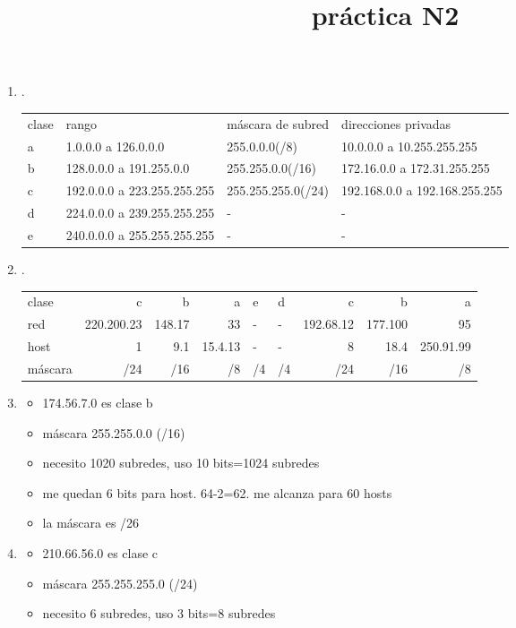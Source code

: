 \documentclass[11pt]{article}
\date{}
\title{práctica N2}
\begin{document}
\maketitle
\begin{enumerate}
\item .
\begin{center}
\begin{tabular}{llll}
clase & rango & máscara de subred & direcciones privadas\\
a & 1.0.0.0 a 126.0.0.0 & 255.0.0.0(/8) & 10.0.0.0 a 10.255.255.255\\
b & 128.0.0.0 a 191.255.0.0 & 255.255.0.0(/16) & 172.16.0.0 a 172.31.255.255\\
c & 192.0.0.0 a 223.255.255.255 & 255.255.255.0(/24) & 192.168.0.0 a 192.168.255.255\\
d & 224.0.0.0 a 239.255.255.255 & - & -\\
e & 240.0.0.0 a 255.255.255.255 & - & -\\
\end{tabular}
\end{center}
\item .
\begin{center}
\begin{tabular}{lrrrllrrr}
clase & c & b & a & e & d & c & b & a\\
red & 220.200.23 & 148.17 & 33 & - & - & 192.68.12 & 177.100 & 95\\
host & 1 & 9.1 & 15.4.13 & - & - & 8 & 18.4 & 250.91.99\\
máscara & /24 & /16 & /8 & /4 & /4 & /24 & /16 & /8\\
\end{tabular}
\end{center}
\item \begin{itemize}
\item 174.56.7.0 es clase b
\item máscara 255.255.0.0 (/16)
\item necesito 1020 subredes, uso 10 bits=1024 subredes
\item me quedan 6 bits para host. 64-2=62. me alcanza para 60 hosts
\item la máscara es /26
\end{itemize}
\item \begin{itemize}
\item 210.66.56.0 es clase c
\item máscara 255.255.255.0 (/24)
\item necesito 6 subredes, uso 3 bits=8 subredes

\end{itemize}
\end{enumerate}
\end{document}
